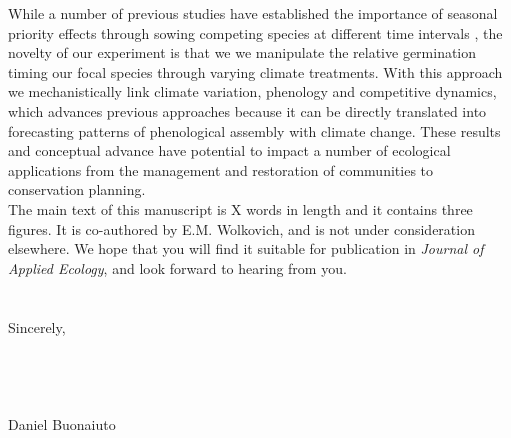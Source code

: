 \documentclass[11.5 pt]{article}
\begin{document}
\noindent While a number of previous studies have established the importance of seasonal priority effects through sowing competing species at different time intervals \citep{Young:2017aa}, the novelty of our experiment is that we we manipulate the relative germination timing our focal species through varying climate treatments. With this approach we mechanistically link climate variation, phenology and competitive dynamics, which advances previous approaches because it can be directly translated into forecasting patterns of phenological assembly with climate change. These results and conceptual advance have potential to impact a number of ecological applications from the management and restoration of communities to conservation planning.\\

\noindent The main text of this manuscript is X words in length and it contains three figures. It is co-authored by E.M. Wolkovich, and is not under consideration elsewhere. We hope that you will find it suitable for publication in \textit{Journal of Applied Ecology}, and look forward to hearing from you.\\\\ 
\\Sincerely,\\\\\\\\\\

\noindent Daniel Buonaiuto\\


\end{document}
